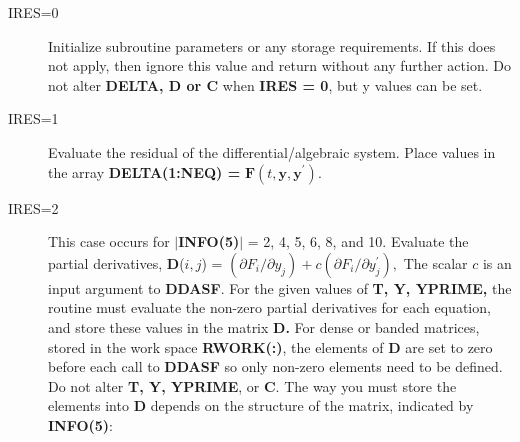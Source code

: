 \documentclass[twoside]{MATH77}
\begin{document}
\begin{description}
\item[IRES=0] Initialize subroutine parameters or any storage
  requirements.  If this does not apply, then ignore this value and
  return without any further action.  Do not alter \textbf{DELTA, D or
    C} when \textbf{IRES = 0}, but y values can be set.
\item[IRES=1] Evaluate the residual of the
  differential/algebraic system.  Place values in the array \textbf{DELTA(1:NEQ) =}
  $\mathbf{F}(t,\mathbf{y},\mathbf{y}^{\prime})$.

\item[IRES=2] This case occurs for $|$\textbf{INFO(5)$|$} = 2, 4, 5, 6,
  8, and 10.  Evaluate the partial derivatives, \textbf{D}($i,j$) = $(\partial
  F_{i}/\partial y_{j}) +c (\partial F_{i}/\partial y_{j}^{\prime}),$ The
  scalar $c$ is an input argument to \textbf{DDASF}.  For the given values of
  \textbf{T, Y, YPRIME,} the routine must evaluate the non-zero partial
  derivatives for each equation, and store these values in the matrix
  \textbf{D.} For dense or banded matrices, stored in the work space
  \textbf{RWORK(:)}, the elements of \textbf{D} are set to zero before each
  call to \textbf{DDASF} so only non-zero elements need to be defined.  Do not
  alter \textbf{T, Y, YPRIME}, or \textbf{C}.  The
  way you must store the elements into \textbf{D} depends on the structure of
  the matrix, indicated by \textbf{INFO(5)}:


\end{description}
\end{document}
